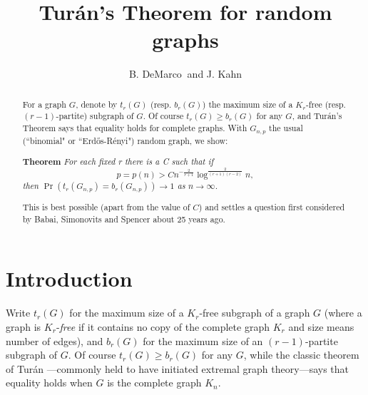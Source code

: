 \documentclass[letterpaper,11pt]{article}
\newcommand{\mn}[0]{\medskip\noindent}
\newcommand{\ra}[0]{\rightarrow}
\newcommand{\ttt}[0]{t}
\newcommand{\0}[0]{\emptyset}
\begin{document}
\renewcommand{\thefootnote}{\fnsymbol{footnote}}




\title{Tur\'an's Theorem for random graphs}
\author{B. DeMarco\footnotemark $~$ and J. Kahn\footnotemark
}
\date{}


\date{}



\maketitle

\begin{abstract}
For a graph $G$, denote by $t_r(G)$ (resp. $b_r(G)$)
the maximum size of a $K_r$-free (resp. $(r-1)$-partite)
subgraph of $G$.
Of course $t_r(G) \geq b_r(G)$ for any $G$,
and Tur\'an's Theorem
says that equality holds for complete graphs.
With $G_{n,p}$ the usual (``binomial" or
``Erd\H{o}s-R\'enyi") random graph, we show:

\mn
{\bf Theorem}
{\em For each fixed r there is a C such that if
\[
p=p(n) > Cn^{-\tfrac{2}{r+1}}\log^{\tfrac{2}{(r+1)(r-2)}}n,
\]
then $\Pr(t_r(G_{n,p})=b_r(G_{n,p}))\ra 1$ as $n\ra\infty$.}

\mn
This is best possible (apart from the value of $C$) and settles a question
first considered by Babai, Simonovits and Spencer about 25 years ago.


\end{abstract}









\section{Introduction}\label{Intro}


Write $\ttt_r(G)$
for the maximum size
of a $K_r$-free
subgraph of a graph $G$
(where a graph is $K_r$-{\em free} if it contains no copy
of the complete graph $K_r$ and size means number of edges),
and $b_r(G)$ for the maximum size of an
$(r-1)$-partite subgraph of $G$.
%
Of course $\ttt_r(G)\geq b_r(G)$ for any $G$,
while the classic theorem of
Tur\'an \cite{Turan}---commonly held to have
initiated extremal graph theory---says that equality holds
when $G$ is the complete graph $K_n$.
\end{document}
